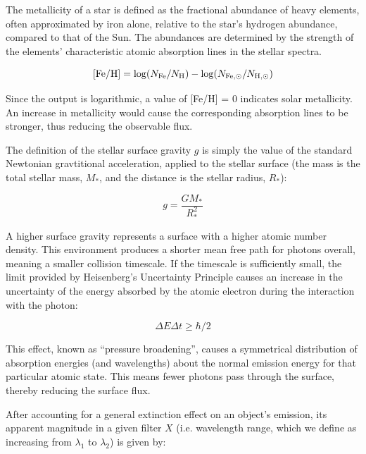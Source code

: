 \documentclass[12pt, a4paper]{report}
\begin{document}
The metallicity of a star is defined as the fractional abundance of heavy elements, often approximated by iron alone, relative to the star's hydrogen abundance, compared to that of the Sun. The abundances are determined by the strength of the elements' characteristic atomic absorption lines in the stellar spectra.

\begin{equation}
\textnormal{[Fe/H]} = \log(N_{\textnormal{Fe}}/N_{\textnormal{H}}) - \log(N_{\textnormal{Fe},\odot}/N_{\textnormal{H},\odot})
\label{FeH_def}
\end{equation}

Since the output is logarithmic, a value of [Fe/H] = 0 indicates solar metallicity. An increase in metallicity would cause the corresponding absorption lines to be stronger, thus reducing the observable flux.

The definition of the stellar surface gravity $g$ is simply the value of the standard Newtonian gravtitional acceleration, applied to the stellar surface (the mass is the total stellar mass, $M_{*}$, and the distance is the stellar radius, $R_{*}$):

\begin{equation}
g = \frac{GM_{*}}{R_{*}^{2}}
\label{gravity_def}
\end{equation}

A higher surface gravity represents a surface with a higher atomic number density. This environment produces a shorter mean free path for photons overall, meaning a smaller collision timescale. If the timescale is sufficiently small, the limit provided by Heisenberg's Uncertainty Principle causes an increase in the uncertainty of the energy absorbed by the atomic electron during the interaction with the photon:

\begin{equation}
\Delta E \Delta t \geq \hbar/2
\label{heisenberg}
\end{equation}

This effect, known as ``pressure broadening'', causes a symmetrical distribution of absorption energies (and wavelengths) about the normal emission energy for that particular atomic state. This means fewer photons pass through the surface, thereby reducing the surface flux.

After accounting for a general extinction effect on an object's emission, its apparent magnitude in a given filter $X$ (i.e. wavelength range, which we define as increasing from $\lambda _{1}$ to $\lambda _{2}$) is given by:
\end{document}
